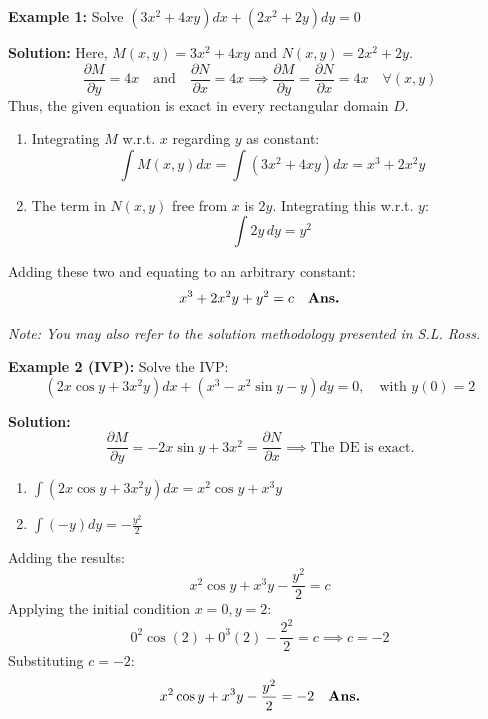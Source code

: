 \documentclass[11pt,a4paper]{article}
\begin{document}
\vspace{0.3cm}
\begin{tcolorbox}[greenbox]
    \textbf{\textcolor{AcademicGreen}{Example 1:}} Solve $(3x^2 + 4xy)dx + (2x^2 + 2y)dy = 0$
    
    \vspace{0.15cm}
    \noindent\textbf{Solution:} Here, $M(x,y) = 3x^2 + 4xy$ and $N(x,y) = 2x^2 + 2y$.
    \[
    \frac{\partial M}{\partial y} = 4x \quad \text{and} \quad \frac{\partial N}{\partial x} = 4x \implies \frac{\partial M}{\partial y} = \frac{\partial N}{\partial x} = 4x \quad \forall (x,y)
    \]
    Thus, the given equation is exact in every rectangular domain $D$.
    
    \begin{enumerate}[label=\arabic*.]
        \item Integrating $M$ w.r.t. $x$ regarding $y$ as constant:
        \[
        \int M(x,y) dx = \int (3x^2 + 4xy) dx = x^3 + 2x^2 y
        \]
        \item The term in $N(x,y)$ free from $x$ is $2y$. Integrating this w.r.t. $y$:
        \[
        \int 2y \, dy = y^2
        \]
    \end{enumerate}
    Adding these two and equating to an arbitrary constant:
    \[
    x^3 + 2x^2 y + y^2 = c \quad \text{\textbf{Ans.}}
    \]
\end{tcolorbox}

\vspace{0.2cm}
\noindent\textit{Note: You may also refer to the solution methodology presented in S.L. Ross.}

\begin{tcolorbox}[greenbox]
    \textbf{\textcolor{AcademicGreen}{Example 2 (IVP):}} Solve the IVP:
    \[
    (2x \cos y + 3x^2 y)dx + (x^3 - x^2 \sin y - y)dy = 0, \quad \text{with } y(0) = 2
    \]
    
    \vspace{0.15cm}
    \noindent\textbf{Solution:}
    \[
    \frac{\partial M}{\partial y} = -2x \sin y + 3x^2 = \frac{\partial N}{\partial x} \implies \text{The DE is exact.}
    \]
    \begin{enumerate}[label=\arabic*.]
        \item $\int (2x \cos y + 3x^2 y) dx = x^2 \cos y + x^3 y$
        \item $\int (-y) dy = -\frac{y^2}{2}$
    \end{enumerate}
    Adding the results:
    \[
    x^2 \cos y + x^3 y - \frac{y^2}{2} = c
    \]
    Applying the initial condition $x = 0, y = 2$:
    \[
    0^2 \cos(2) + 0^3(2) - \frac{2^2}{2} = c \implies c = -2
    \]
    Substituting $c = -2$:
    \[
    x^2 \cos y + x^3 y - \frac{y^2}{2} = -2 \quad \text{\textbf{Ans.}}
    \]
\end{tcolorbox}
\end{document}
